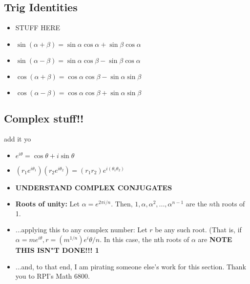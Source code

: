 \documentclass[10pt,letterpaper]{article}
\begin{document}
\subsection*{Trig Identities}
\begin{itemize}
\item STUFF HERE 
\item $\sin (\alpha +\beta )=\sin \alpha \cos \alpha + \sin \beta \cos \alpha$ 
\item $\sin (\alpha - \beta ) = \sin\alpha \cos \beta - \sin \beta \cos \alpha $ 
\item $\cos (\alpha + \beta ) = \cos \alpha \cos \beta - \sin \alpha \sin \beta $ 
\item $\cos (\alpha - \beta ) = \cos \alpha \cos \beta + \sin \alpha \sin \beta $
\end{itemize}

\subsection*{Complex stuff!! }
add it yo 
\begin{itemize}
\item $e^{i\theta}=\cos\theta+i\sin\theta$
\item $(r_1e^{i\theta_1})(r_2e^{i\theta_2})=(r_1r_2)e^{i(\theta_1\theta_2)}$
\item \textbf{UNDERSTAND COMPLEX CONJUGATES }
\item \textbf{Roots of unity:} Let $\alpha = e^{2\pi i/n}. \mbox{ Then, } 1, \alpha, \alpha^2,...,\alpha^{n-1}$ 
are the $n$th roots of 1. 
\item ...applying this to any complex number: Let $r$ be any such root. (That is, if
$\alpha = me^{i\theta}, r=(m^{1/n})e^i\theta/n$. In this case, the nth roots of 
$\alpha$ are \textbf{NOTE THIS ISN"T DONE!!! 1}
\item ...and, to that end, I am pirating someone else's work for this section. Thank you to RPI's Math 6800. 

\end{itemize}





\iffalse 
#### sources 
* http://inside.mines.edu/fs_home/gmurray/teach/s02/trialSoln.pdf
* http://homepages.rpi.edu/~henshw/courses/fall2014/math6800/complexCheatSheet.pdf

\fi 
\end{document}
